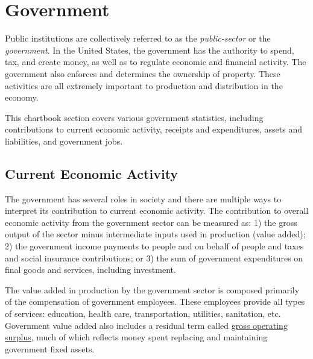 \documentclass{report}
\begin{document}
{\begin{minipage}{0.76\textwidth}
\section*{\color{darkgray}\LARGE Government}
\label{sec:gov}
\small Public institutions are collectively referred to as the \textit{public-sector} or the \textit{government}. In the United States, the government has the authority to spend, tax, and create money, as well as to regulate economic and financial activity. The government also enforces and determines the ownership of property. These activities are all extremely important to production and distribution in the economy.

This chartbook section covers various government statistics, including contributions to current economic activity, receipts and expenditures, assets and liabilities, and government jobs.
\subsection*{\color{black!70} \seriffont Current Economic Activity}
\small The government has several roles in society and there are multiple ways to interpret its contribution to current economic activity. The contribution to overall economic activity from the government sector can be measured as: 1) the gross output of the sector minus intermediate inputs used in production (value added); 2) the government income payments to people and on behalf of people and taxes and social insurance contributions; or 3) the sum of government expenditures on final goods and services, including investment. 

The value added in production by the government sector is composed primarily of the compensation of government employees. These employees provide all types of services: education, health care, transportation, utilities, sanitation, etc. Government value added also includes a residual term called \href{https://www.bea.gov/help/glossary/gross-operating-surplus}{gross operating surplus}, much of which reflects money spent replacing and maintaining government fixed assets. 
\end{minipage}
\vspace{2mm}

}
\end{document}
